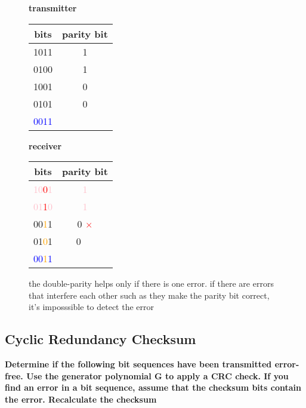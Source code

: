 \documentclass[a4paper,12pt]{article}
\begin{document}
	\begin{figure}[h!]
		\begin{minipage}{0.3\linewidth}
			\textbf{transmitter}\\
			\begin{tabular}{c|c}
				 bits & parity bit \\ \hline
				 1011 & 1 \\
				 0100 & 1 \\
				 1001 & 0 \\
				 0101 & 0 \\ \hline
				 \textcolor{blue}{0011} & \\ 
			\end{tabular}
		\end{minipage}
	\hfill
	\begin{minipage}{0.3\linewidth}
		\textbf{receiver}\\
		\begin{tabular}{c|c}
			bits & parity bit \\ \hline
			\textcolor{pink}{10\textcolor{red}{0}1} & \textcolor{pink}{1} \textcolor{green}{\checkmark} \\
			\textcolor{pink}{01\textcolor{red}{1}0} & \textcolor{pink}{1} \textcolor{green}{\checkmark} \\
			00\textcolor{orange}{1}1 & 0 \textcolor{red}{$\times$} \\
			01\textcolor{orange}{0}1 & 0 ~~ \\ \hline
			\textcolor{blue}{00\textcolor{orange}{1}1} & \\ 
		\end{tabular}
	\end{minipage}
	\hfill
	\begin{minipage}{0.36\linewidth}
		the double-parity helps only if there is one error. if there are errors that interfere each other such as they make the parity bit correct, it's imposssible to detect the error
	\end{minipage}

	\end{figure}
	
	\subsection{Cyclic Redundancy Checksum}
	\textbf{Determine if the following bit sequences have been transmitted error-free.  Use the generator polynomial G	to apply a CRC check. If you find an error in a bit sequence,  assume that the checksum bits contain the error. Recalculate the checksum\\}
		
\end{document}
